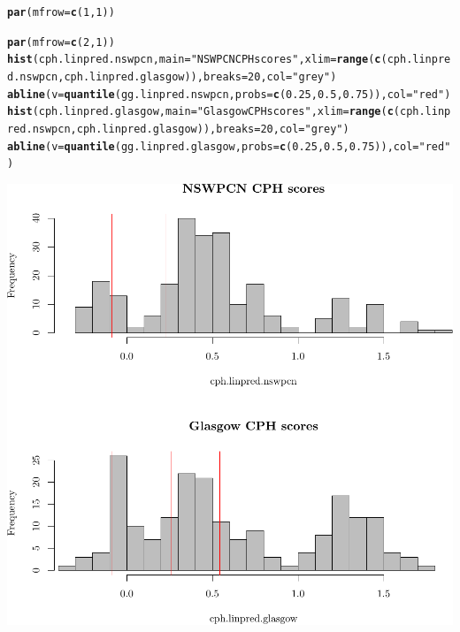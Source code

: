 \documentclass{article}\usepackage[]{graphicx}\usepackage[]{color}
\makeatletter
\def\maxwidth{ %
  \ifdim\Gin@nat@width>\linewidth
    \linewidth
  \else
    \Gin@nat@width
  \fi
}
\newcommand{\hlnum}[1]{\textcolor[rgb]{0.686,0.059,0.569}{#1}}%
\newcommand{\hlstr}[1]{\textcolor[rgb]{0.192,0.494,0.8}{#1}}%
\newcommand{\hlstd}[1]{\textcolor[rgb]{0.345,0.345,0.345}{#1}}%
\newcommand{\hlkwc}[1]{\textcolor[rgb]{0.333,0.667,0.333}{#1}}%
\newcommand{\hlkwd}[1]{\textcolor[rgb]{0.737,0.353,0.396}{\textbf{#1}}}%
\newenvironment{kframe}{%
 \def\at@end@of@kframe{}%
 \ifinner\ifhmode%
  \def\at@end@of@kframe{\end{minipage}}%
  \begin{minipage}{\columnwidth}%
 \fi\fi%
 \def\FrameCommand##1{\hskip\@totalleftmargin \hskip-\fboxsep
 \colorbox{shadecolor}{##1}\hskip-\fboxsep
     \hskip-\linewidth \hskip-\@totalleftmargin \hskip\columnwidth}%
 \MakeFramed {\advance\hsize-\width
   \@totalleftmargin\z@ \linewidth\hsize
   \@setminipage}}%
 {\par\unskip\endMakeFramed%
 \at@end@of@kframe}
\newenvironment{knitrout}{}{} %
\makeatother
\begin{document}
\begin{knitrout}
{}


\begin{kframe}\begin{alltt}
\hlkwd{par}\hlstd{(}\hlkwc{mfrow} \hlstd{=} \hlkwd{c}\hlstd{(}\hlnum{1}\hlstd{,} \hlnum{1}\hlstd{))}

\hlkwd{par}\hlstd{(}\hlkwc{mfrow} \hlstd{=} \hlkwd{c}\hlstd{(}\hlnum{2}\hlstd{,} \hlnum{1}\hlstd{))}
\hlkwd{hist}\hlstd{(cph.linpred.nswpcn,} \hlkwc{main} \hlstd{=} \hlstr{"NSWPCN CPH scores"}\hlstd{,} \hlkwc{xlim} \hlstd{=} \hlkwd{range}\hlstd{(}\hlkwd{c}\hlstd{(cph.linpred.nswpcn, cph.linpred.glasgow)),} \hlkwc{breaks} \hlstd{=} \hlnum{20}\hlstd{,} \hlkwc{col} \hlstd{=} \hlstr{"grey"}\hlstd{)}
\hlkwd{abline}\hlstd{(}\hlkwc{v} \hlstd{=} \hlkwd{quantile}\hlstd{(gg.linpred.nswpcn,} \hlkwc{probs} \hlstd{=} \hlkwd{c}\hlstd{(}\hlnum{0.25}\hlstd{,} \hlnum{0.5}\hlstd{,} \hlnum{0.75}\hlstd{)),} \hlkwc{col} \hlstd{=} \hlstr{"red"}\hlstd{)}
\hlkwd{hist}\hlstd{(cph.linpred.glasgow,} \hlkwc{main} \hlstd{=} \hlstr{"Glasgow CPH scores"}\hlstd{,} \hlkwc{xlim} \hlstd{=} \hlkwd{range}\hlstd{(}\hlkwd{c}\hlstd{(cph.linpred.nswpcn, cph.linpred.glasgow)),} \hlkwc{breaks} \hlstd{=} \hlnum{20}\hlstd{,} \hlkwc{col} \hlstd{=} \hlstr{"grey"}\hlstd{)}
\hlkwd{abline}\hlstd{(}\hlkwc{v} \hlstd{=} \hlkwd{quantile}\hlstd{(gg.linpred.glasgow,} \hlkwc{probs} \hlstd{=} \hlkwd{c}\hlstd{(}\hlnum{0.25}\hlstd{,} \hlnum{0.5}\hlstd{,} \hlnum{0.75}\hlstd{)),} \hlkwc{col} \hlstd{=} \hlstr{"red"}\hlstd{)}
\end{alltt}
\end{kframe}

{\centering \includegraphics[width=\maxwidth]{figure/05-score-hists-2} 

}
\end{knitrout}
\end{document}
